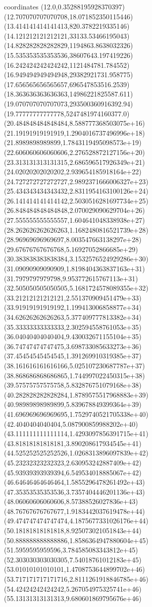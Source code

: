 coordinates {%
(12.0,0.35288195928370397)
(12.707070707070708,18.071852350115446)
(13.414141414141413,820.3782219335146)
(14.121212121212121,33133.53466195043)
(14.828282828282829,1194863.8638032326)
(15.535353535353536,38607643.197419226)
(16.242424242424242,1121484781.784552)
(16.949494949494948,29382921731.958775)
(17.656565656565657,696547853516.2539)
(18.363636363636363,14986221825587.611)
(19.070707070707073,293500360916392.94)
(19.77777777777778,5247481974160377.0)
(20.484848484848484,8.588777368503075e+16)
(21.19191919191919,1.2904016737496996e+18)
(21.8989898989899,1.7843119495098573e+19)
(22.606060606060606,2.276528872127156e+20)
(23.313131313131315,2.686596517926349e+21)
(24.02020202020202,2.939654185918164e+22)
(24.727272727272727,2.9892371666006327e+23)
(25.434343434343432,2.8311954163100126e+24)
(26.141414141414142,2.5030516281697734e+25)
(26.848484848484848,2.070029090629704e+26)
(27.555555555555557,1.604641048338938e+27)
(28.262626262626263,1.1682480816521739e+28)
(28.96969696969697,8.003547663138297e+28)
(29.67676767676768,5.16927052866685e+29)
(30.383838383838384,3.1532576524929286e+30)
(31.09090909090909,1.8198404363837163e+31)
(31.7979797979798,9.953772615767113e+31)
(32.505050505050505,5.1681724578089355e+32)
(33.21212121212121,2.551370909451479e+33)
(33.91919191919192,1.199413006858877e+34)
(34.62626262626263,5.377409777813382e+34)
(35.33333333333333,2.302594558761053e+35)
(36.04040404040404,9.430032671155104e+35)
(36.74747474747475,3.698733085633273e+36)
(37.45454545454545,1.391269910319385e+37)
(38.161616161616166,5.025107230687787e+37)
(38.868686868686865,1.744997022450315e+38)
(39.57575757575758,5.832876751079168e+38)
(40.282828282828284,1.8789575517968883e+39)
(40.98989898989899,5.839678849399364e+39)
(41.696969696969695,1.7529740521705338e+40)
(42.4040404040404,5.087900859988202e+40)
(43.111111111111114,1.4293097856391715e+41)
(43.81818181818181,3.890208617934545e+41)
(44.525252525252526,1.0268313896097839e+42)
(45.23232323232323,2.630953242887409e+42)
(45.93939393939394,6.549534018885067e+42)
(46.64646464646464,1.5855296478261492e+43)
(47.35353535353536,3.7357404446201136e+43)
(48.06060606060606,8.57388526027836e+43)
(48.76767676767677,1.9183442037619478e+44)
(49.474747474747474,4.1875677331026176e+44)
(50.18181818181818,8.925073021051843e+44)
(50.888888888888886,1.8586364947880604e+45)
(51.5959595959596,3.784585083343812e+45)
(52.303030303030305,7.54018761012183e+45)
(53.01010101010101,1.4708753644899702e+46)
(53.717171717171716,2.8111261918846785e+46)
(54.42424242424242,5.267054975325741e+46)
(55.13131313131313,9.680601869795676e+46)
}
